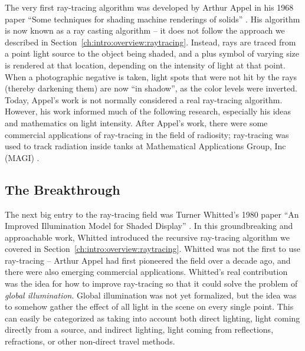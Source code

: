 The very first ray-tracing algorithm was developed by Arthur Appel in his 1968 paper ``Some techniques for shading machine renderings of solids'' \cite{appel1968some}.
His algorithm is now known as a ray casting algorithm -- it does not follow the approach we described in Section~\ref{ch:intro:overview:raytracing}.
Instead, rays are traced from a point light source to the object being shaded, and a plus symbol of varying size is rendered at that location, depending on the intensity of light at that point.
When a photographic negative is taken, light spots that were not hit by the rays (thereby darkening them) are now ``in shadow'', as the color levels were inverted.
Today, Appel's work is not normally considered a real ray-tracing algorithm.
However, his work informed much of the following research, especially his ideas and mathematics on light intensity.
After Appel's work, there were some commercial applications of ray-tracing in the field of radiosity; ray-tracing was used to track radiation inside tanks at Mathematical Applications Group, Inc (MAGI) \cite{whitted2018explains}.

\subsection{The Breakthrough}
\label{ch:relatedwork:discovery:breakthrough}

The next big entry to the ray-tracing field was Turner Whitted's 1980 paper ``An Improved Illumination Model for Shaded Display'' \cite{whitted1980improved}.
In this groundbreaking and approachable work, Whitted introduced the recursive ray-tracing algorithm we covered in Section~\ref{ch:intro:overview:raytracing}.
Whitted was not the first to use ray-tracing -- Arthur Appel had first pioneered the field over a decade ago, and there were also emerging commercial applications.
Whitted's real contribution was the idea for how to improve ray-tracing so that it could solve the problem of {\it global illumination}.
Global illumination was not yet formalized, but the idea was to somehow gather the effect of all light in the scene on every single point.
This can easily be categorized as taking into account both direct lighting, light coming directly from a source, and indirect lighting, light coming from reflections, refractions, or other non-direct travel methods.

